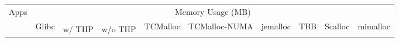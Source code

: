 \begin{table*}[tp]
\footnotesize
  \centering
    \begin{tabular}{|l|r|rr|rrrrrr|}
    \hline
    \multirow{3}{*}{Apps}&
    \multicolumn{9}{c|}{Memory Usage (MB)}\\
    \cline{2-10}
    &\multirow{2}{*}{Glibc}&\multicolumn{2}{c|}{\NM{}}&\multirow{2}{*}{TCMalloc}&\multirow{2}{*}{TCMalloc-NUMA}&\multirow{2}{*}{jemalloc}&\multirow{2}{*}{TBB}&\multirow{2}{*}{Scalloc}&\multirow{2}{*}{mimalloc} \\ \cline{3-4} 
    && w/ THP & w/o THP &&&&&& \\ \hline
    \hline




\end{tabular}
\end{table*}
